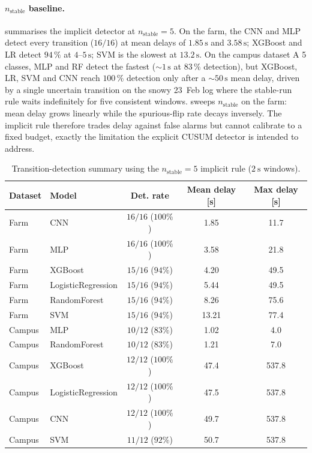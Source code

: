 \paragraph{$n_{\text{stable}}$ baseline.}  summarises the implicit detector at $n_{\text{stable}} = 5$. On the farm, the CNN and MLP detect every transition ($16/16$) at mean delays of $1.85\,\text{s}$ and $3.58\,\text{s}$; XGBoost and LR detect $94\,\%$ at $4$--$5\,\text{s}$; SVM is the slowest at $13.2\,\text{s}$. On the campus dataset A 5 classes, MLP and RF detect the fastest ($\sim 1\,\text{s}$ at $83\,\%$ detection), but XGBoost, LR, SVM and CNN reach $100\,\%$ detection only after a $\sim 50\,\text{s}$ mean delay, driven by a single uncertain transition on the snowy 23~Feb log where the stable-run rule waits indefinitely for five consistent windows.  sweeps $n_{\text{stable}}$ on the farm: mean delay grows linearly while the spurious-flip rate decays inversely. The implicit rule therefore trades delay against false alarms but cannot calibrate to a fixed budget, exactly the limitation the explicit CUSUM detector is intended to address.

\vspace{-4mm}
\begin{table}[H]
\centering
\small
\caption{Transition-detection summary using the $n_{\text{stable}} = 5$ implicit rule ($\SI{2}{\second}$ windows).}
\label{tab:transition_nstable}
\begin{tabular}{llccc}
\toprule
\textbf{Dataset} & \textbf{Model} & \textbf{Det. rate} &
\textbf{Mean delay [s]} & \textbf{Max delay [s]} \\
\midrule
Farm    & CNN                & $16/16$ ($100\%$) & 1.85  & 11.7  \\
Farm    & MLP                & $16/16$ ($100\%$) & 3.58  & 21.8  \\
Farm    & XGBoost            & $15/16$ ($94\%$)  & 4.20  & 49.5  \\
Farm    & LogisticRegression & $15/16$ ($94\%$)  & 5.44  & 49.5  \\
Farm    & RandomForest       & $15/16$ ($94\%$)  & 8.26  & 75.6  \\
Farm    & SVM                & $15/16$ ($94\%$)  & 13.21 & 77.4  \\
\midrule
Campus  & MLP                & $10/12$ ($83\%$)  & 1.02  & 4.0   \\
Campus  & RandomForest       & $10/12$ ($83\%$)  & 1.21  & 7.0   \\
Campus  & XGBoost            & $12/12$ ($100\%$) & 47.4  & 537.8 \\
Campus  & LogisticRegression & $12/12$ ($100\%$) & 47.5  & 537.8 \\
Campus  & CNN                & $12/12$ ($100\%$) & 49.7  & 537.8 \\
Campus  & SVM                & $11/12$ ($92\%$)  & 50.7  & 537.8 \\
\bottomrule
\end{tabular}
\end{table}

